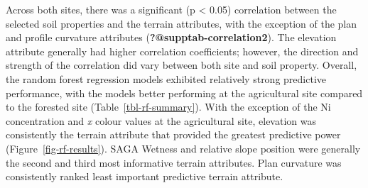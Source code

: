 \documentclass[
  number]{elsarticle}
\begin{document}
Across both sites, there was a significant (p \textless{} 0.05)
correlation between the selected soil properties and the terrain
attributes, with the exception of the plan and profile curvature
attributes (\textbf{?@supptab-correlation2}). The elevation attribute
generally had higher correlation coefficients; however, the direction
and strength of the correlation did vary between both site and soil
property. Overall, the random forest regression models exhibited
relatively strong predictive performance, with the models better
performing at the agricultural site compared to the forested site
(Table~\ref{tbl-rf-summary}). With the exception of the Ni concentration
and \emph{x} colour values at the agricultural site, elevation was
consistently the terrain attribute that provided the greatest predictive
power (Figure~\ref{fig-rf-results}). SAGA Wetness and relative slope
position were generally the second and third most informative terrain
attributes. Plan curvature was consistently ranked least important
predictive terrain attribute.
\end{document}
